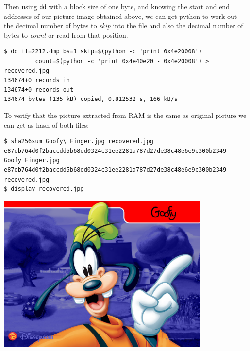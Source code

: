 \documentclass[a4paper,
    11pt,
    normalheadings,
    parindent,
    UKenglish,
    abstracton,
    ]{scrartcl}
\begin{document}
Then using \texttt{dd} with a block size of one byte, and knowing the start and end addresses of our picture image obtained above,  we can get python to work out the decimal number of bytes to \emph{skip} into the file and also the decimal number of bytes to \emph{count} or read from that position.

\begin{verbatim}
$ dd if=2212.dmp bs=1 skip=$(python -c 'print 0x4e20008')
         count=$(python -c 'print 0x4e40e20 - 0x4e20008') > recovered.jpg
134674+0 records in
134674+0 records out
134674 bytes (135 kB) copied, 0.812532 s, 166 kB/s
\end{verbatim}

To verify that the picture extracted from RAM is the same as original picture we can get as hash of both files:
\begin{verbatim}
$ sha256sum Goofy\ Finger.jpg recovered.jpg
e87db764d0f2baccdd5b68dd0324c31ee2281a787d27de38c48e6e9c300b2349  Goofy Finger.jpg
e87db764d0f2baccdd5b68dd0324c31ee2281a787d27de38c48e6e9c300b2349  recovered.jpg
$ display recovered.jpg
\end{verbatim}
\begin{center} \includegraphics[width=0.8\textwidth]{bin/goofy} \end{center}
\end{document}
